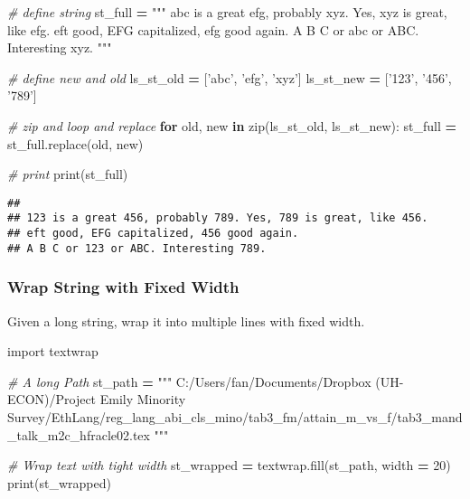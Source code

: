 \documentclass[
]{book}
\newenvironment{Shaded}{\begin{snugshade}}{\end{snugshade}}
\newcommand{\BuiltInTok}[1]{#1}
\newcommand{\CommentTok}[1]{\textcolor[rgb]{0.56,0.35,0.01}{\textit{#1}}}
\newcommand{\ControlFlowTok}[1]{\textcolor[rgb]{0.13,0.29,0.53}{\textbf{#1}}}
\newcommand{\DecValTok}[1]{\textcolor[rgb]{0.00,0.00,0.81}{#1}}
\newcommand{\ImportTok}[1]{#1}
\newcommand{\KeywordTok}[1]{\textcolor[rgb]{0.13,0.29,0.53}{\textbf{#1}}}
\newcommand{\NormalTok}[1]{#1}
\newcommand{\OperatorTok}[1]{\textcolor[rgb]{0.81,0.36,0.00}{\textbf{#1}}}
\newcommand{\StringTok}[1]{\textcolor[rgb]{0.31,0.60,0.02}{#1}}
\begin{document}
\begin{Shaded}
\begin{Highlighting}[]
\CommentTok{# define string}
\NormalTok{st_full }\OperatorTok{=} \StringTok{"""}
\StringTok{abc is a great efg, probably xyz. Yes, xyz is great, like efg. }
\StringTok{eft good, EFG capitalized, efg good again. }
\StringTok{A B C or abc or ABC. Interesting xyz. }
\StringTok{"""}

\CommentTok{# define new and old}
\NormalTok{ls_st_old }\OperatorTok{=}\NormalTok{ [}\StringTok{'abc'}\NormalTok{, }\StringTok{'efg'}\NormalTok{, }\StringTok{'xyz'}\NormalTok{]}
\NormalTok{ls_st_new }\OperatorTok{=}\NormalTok{ [}\StringTok{'123'}\NormalTok{, }\StringTok{'456'}\NormalTok{, }\StringTok{'789'}\NormalTok{]}

\CommentTok{# zip and loop and replace}
\ControlFlowTok{for}\NormalTok{ old, new }\KeywordTok{in} \BuiltInTok{zip}\NormalTok{(ls_st_old, ls_st_new):}
\NormalTok{  st_full }\OperatorTok{=}\NormalTok{ st_full.replace(old, new)}

\CommentTok{# print}
\BuiltInTok{print}\NormalTok{(st_full)}
\end{Highlighting}
\end{Shaded}

\begin{verbatim}
## 
## 123 is a great 456, probably 789. Yes, 789 is great, like 456. 
## eft good, EFG capitalized, 456 good again. 
## A B C or 123 or ABC. Interesting 789.
\end{verbatim}

\hypertarget{wrap-string-with-fixed-width}{%
\subsubsection{Wrap String with Fixed Width}\label{wrap-string-with-fixed-width}}

Given a long string, wrap it into multiple lines with fixed width.

\begin{Shaded}
\begin{Highlighting}[]
\ImportTok{import}\NormalTok{ textwrap}

\CommentTok{# A long Path}
\NormalTok{st_path }\OperatorTok{=} \StringTok{"""}
\StringTok{C:/Users/fan/Documents/Dropbox (UH-ECON)/Project Emily Minority Survey/EthLang/reg_lang_abi_cls_mino/tab3_fm/attain_m_vs_f/tab3_mand_talk_m2c_hfracle02.tex}
\StringTok{"""}

\CommentTok{# Wrap text with tight width}
\NormalTok{st_wrapped }\OperatorTok{=}\NormalTok{ textwrap.fill(st_path, width }\OperatorTok{=} \DecValTok{20}\NormalTok{)}
\BuiltInTok{print}\NormalTok{(st_wrapped)}
\end{Highlighting}
\end{Shaded}
\end{document}
